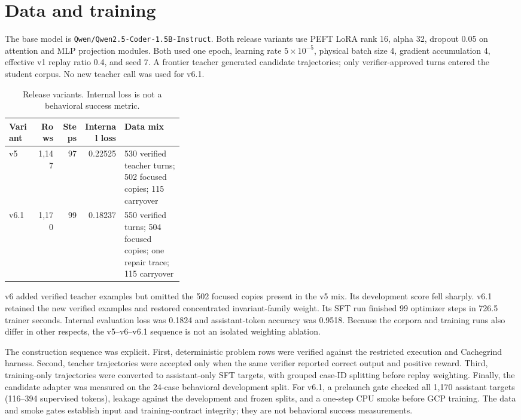 \documentclass[11pt]{article}
\begin{document}
\section{Data and training}
The base model is \texttt{Qwen/Qwen2.5-Coder-1.5B-Instruct}. Both release
variants use PEFT LoRA rank 16, alpha 32, dropout 0.05 on attention and MLP
projection modules. Both used one epoch, learning rate $5\times10^{-5}$,
physical batch size 4, gradient accumulation 4, effective v1 replay ratio
0.4, and seed 7. A frontier teacher generated candidate trajectories;
only verifier-approved turns entered the student corpus. No new teacher
call was used for v6.1.

\begin{table}[h]
\centering\small
\begin{tabular}{lrrrp{0.34\linewidth}}
\toprule
Variant & Rows & Steps & Internal loss & Data mix \\
\midrule
v5 & 1,147 & 97 & 0.22525 & 530 verified teacher turns; 502 focused copies; 115 carryover \\
v6.1 & 1,170 & 99 & 0.18237 & 550 verified turns; 504 focused copies; one repair trace; 115 carryover \\
\bottomrule
\end{tabular}
\caption{Release variants. Internal loss is not a behavioral success metric.}
\end{table}

v6 added verified teacher examples but omitted the 502 focused copies present
in the v5 mix. Its development score fell sharply. v6.1 retained the new
verified examples and restored concentrated invariant-family weight. Its SFT
run finished 99 optimizer steps in 726.5 trainer seconds. Internal evaluation
loss was 0.1824 and assistant-token accuracy was 0.9518. Because the corpora
and training runs also differ in other respects, the v5--v6--v6.1 sequence
is not an isolated weighting ablation.

The construction sequence was explicit. First, deterministic problem rows
were verified against the restricted execution and Cachegrind harness.
Second, teacher trajectories were accepted only when the same verifier
reported correct output and positive reward. Third, training-only trajectories
were converted to assistant-only SFT targets, with grouped case-ID splitting
before replay weighting. Finally, the candidate adapter was measured on the
24-case behavioral development split. For v6.1, a prelaunch gate checked all
1,170 assistant targets (116--394 supervised tokens), leakage against the
development and frozen splits, and a one-step CPU smoke before GCP training.
The data and smoke gates establish input and training-contract integrity;
they are not behavioral success measurements.
\end{document}

